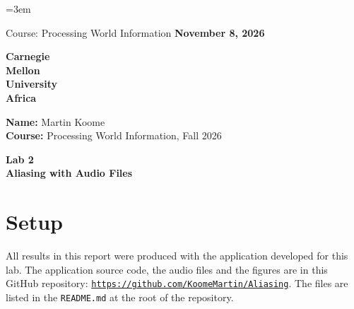 \documentclass[12pt, letterpaper]{article}
\begin{document}
\emergencystretch=3em
\newcommand{\repourl}{https://github.com/KoomeMartin/Aliasing}
\begin{titlepage}
  \thispagestyle{empty}
  \noindent
  {\small Course: Processing World Information} \hfill {\textbf{November 8, 2026}}
  \vspace{3cm}
  \begin{flushleft}
    {\fontsize{55}{50}\selectfont \textbf{\textcolor{cmured}{Carnegie}}}\\[4mm]
    {\fontsize{55}{50}\selectfont \textbf{\textcolor{cmured}{Mellon}}}\\[4mm]
    {\fontsize{55}{50}\selectfont \textbf{\textcolor{cmured}{University}}}\\[2mm]
    {\fontsize{45}{50}\selectfont \textbf{\textcolor{cmugrey}{Africa}}}
  \end{flushleft}
  \vfill
  \begin{flushleft}
    \textbf{Name:} Martin Koome \\
    \vspace{0.2cm}
    \textbf{Course:} Processing World Information, Fall 2026
  \end{flushleft}
  \vspace{1.5cm}
  \begin{center}
    \large \textbf{Lab 2} \\[0.5cm]
    \large \textbf{Aliasing with Audio Files}
  \end{center}
  \vspace{2cm}
\end{titlepage}

\section{Setup}

All results in this report were produced with the application developed for this lab. The application source code, the audio files and the figures are in this GitHub repository: \href{\repourl}{\texttt{\repourl}}. The files are listed in the \texttt{README.md} at the root of the repository.
\end{document}

